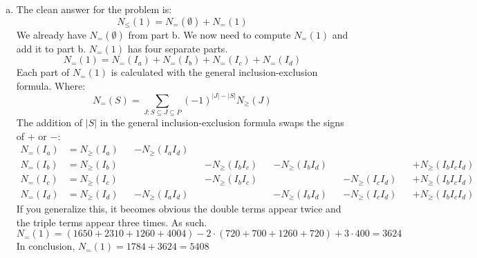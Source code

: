 \documentclass{article}
\begin{document}
\begin{enumerate}[(a)]
    \item The clean answer for the problem is:
    \begin{equation*}
        N_{\le}(1) = N_{=}(\emptyset) + N_{=}(1)
    \end{equation*}
    We already have $N_{=}(\emptyset)$ from part b. We now need to compute $N_{=}(1)$ and add it to part b. $N_{=}(1)$ has four separate parts.
    \begin{equation*}
        N_{=}(1) = N_{=}(I_a) + N_{=}(I_b) + N_{=}(I_c) + N_{=}(I_d)
    \end{equation*}
    Each part of $N_{=}(1)$ is calculated with the general inclusion-exclusion formula. Where:
    \begin{equation*}
        N_{=}(S) = \sum_{J: S \subseteq J \subseteq P} (-1)^{|J|-|S|} N_{\ge}(J)
    \end{equation*}
    The addition of $|S|$ in the general inclusion-exclusion formula swaps the signs of $+$ or $-$:
    \begin{align*}
    N_{=}(I_a) &= N_{\ge}(I_a) &&- N_{\ge}(I_aI_d) && && && \\
    N_{=}(I_b) &= N_{\ge}(I_b) && &&- N_{\ge}(I_bI_c) &&- N_{\ge}(I_bI_d) && &&+ N_{\ge}(I_bI_cI_d) \\
    N_{=}(I_c) &= N_{\ge}(I_c) && &&- N_{\ge}(I_bI_c) && &&- N_{\ge}(I_cI_d) &&+ N_{\ge}(I_bI_cI_d) \\
    N_{=}(I_d) &= N_{\ge}(I_d) &&- N_{\ge}(I_aI_d) && &&- N_{\ge}(I_bI_d) &&- N_{\ge}(I_cI_d) &&+ N_{\ge}(I_bI_cI_d)
    \end{align*}
    If you generalize this, it becomes obvious the double terms appear twice and the triple terms appear three times. As such.
    \begin{equation*}
        N_{=}(1) = (1650 + 2310 + 1260 + 4004) - 2 \cdot (720 + 700 + 1260 + 720) + 3 \cdot 400 = 3624
    \end{equation*}
    In conclusion, $N_{=}(1) = 1784 + 3624 = 5408$
\end{enumerate}
\end{document}
